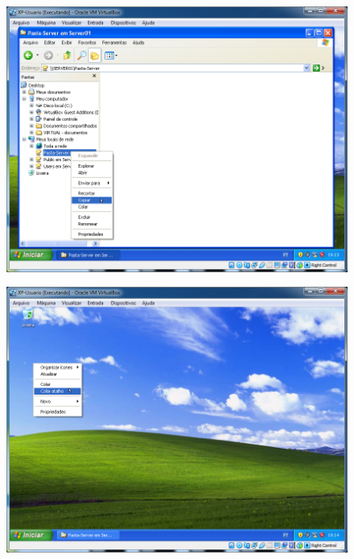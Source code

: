 \documentclass[10pt]{article}
\begin{document}
\begin{figure}[H]
    \centering
    \caption{}
    \label{fig:5124}
    \includegraphics[width=\linewidth]{images/windows_server/compartilhamento/023.png}
\end{figure}
\begin{figure}[H]
    \centering
    \caption{}
    \label{fig:5125}
    \includegraphics[width=\linewidth]{images/windows_server/compartilhamento/024.png}
\end{figure}
\end{document}
